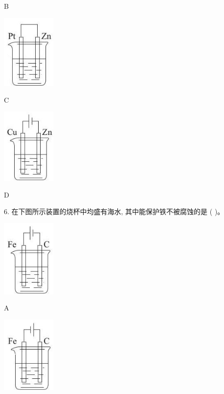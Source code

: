 \documentclass[10pt]{article}
\begin{document}
B

\begin{center}
\includegraphics[max width=0.2\textwidth]{images/0190da9d-8bfd-732f-bc2c-0b21d0f13b91_122_920427.jpg}
\end{center}

C

\begin{center}
\includegraphics[max width=0.2\textwidth]{images/0190da9d-8bfd-732f-bc2c-0b21d0f13b91_122_400131.jpg}
\end{center}

D

6. 在下图所示装置的烧杯中均盛有海水, 其中能保护铁不被腐蚀的是 ( )。

\begin{center}
\includegraphics[max width=0.2\textwidth]{images/0190da9d-8bfd-732f-bc2c-0b21d0f13b91_122_596847.jpg}
\end{center}

A

\begin{center}
\includegraphics[max width=0.2\textwidth]{images/0190da9d-8bfd-732f-bc2c-0b21d0f13b91_122_583451.jpg}
\end{center}
\end{document}
